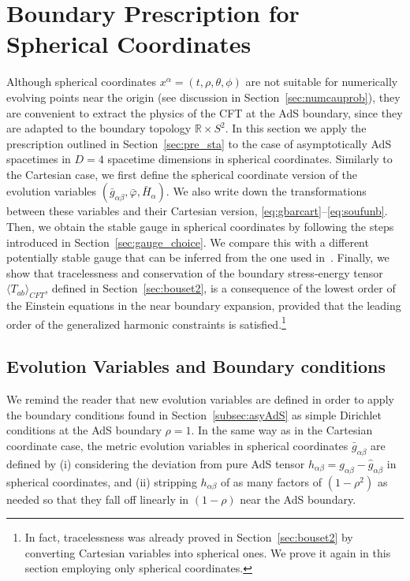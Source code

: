 \documentclass[a4paper,11pt]{article}
\numberwithin{equation}{section}
\begin{document}
\section{Boundary Prescription for Spherical Coordinates}\label{sec:sphevvarboucon}

Although spherical coordinates $x^\alpha=(t,\rho,\theta,\phi)$ are not suitable for numerically evolving points near the origin (see discussion in Section~\ref{sec:numcauprob}), they are convenient to extract the physics of the CFT at the AdS boundary, since they are adapted to the boundary topology $\mathbb{R}\times S^2$.
In this section we apply the prescription outlined in Section~\ref{sec:pre_sta} to the case of asymptotically AdS spacetimes in $D=4$ spacetime dimensions in spherical coordinates. Similarly to the Cartesian case, we first define the spherical coordinate version of the evolution variables $(\bar{g}_{\alpha\beta},\bar{\varphi},\bar{H}_\alpha)$. We also write down the transformations between these variables and their Cartesian version, \eqref{eq:gbarcart}--\eqref{eq:soufunb}. Then, we obtain the stable gauge in spherical coordinates by following the steps introduced in Section~\ref{sec:gauge_choice}. We compare this with a different potentially stable gauge that can be inferred from the one used in~\cite{Bantilan:2012vu}. Finally, we show that tracelessness and conservation of the boundary stress-energy tensor $\langle T_{ab}\rangle_{CFT}$, defined in Section~\ref{sec:bouset2}, is a consequence of the lowest order of the Einstein equations in the near boundary expansion, provided that the leading order of the generalized harmonic constraints is satisfied.\footnote{In fact, tracelessness was already proved in Section~\ref{sec:bouset2} by converting Cartesian variables into spherical ones. We prove it again in this section employing only spherical coordinates.}

\subsection{Evolution Variables and Boundary conditions}

We remind the reader that new evolution variables are defined in order to apply the boundary conditions found in Section~\ref{subsec:asyAdS} as simple Dirichlet conditions at the AdS boundary $\rho=1$. In the same way as in the Cartesian coordinate case, the metric evolution variables in spherical coordinates $\bar{g}_{\alpha\beta}$ are defined by (i) considering the deviation from pure AdS tensor $h_{\alpha\beta}=g_{\alpha\beta}-\hat{g}_{\alpha\beta}$ in spherical coordinates, and (ii) stripping $h_{\alpha\beta}$ of as many factors of $(1-\rho^2)$ as needed so that they fall off linearly in $(1-\rho)$ near the AdS boundary.
\end{document}
